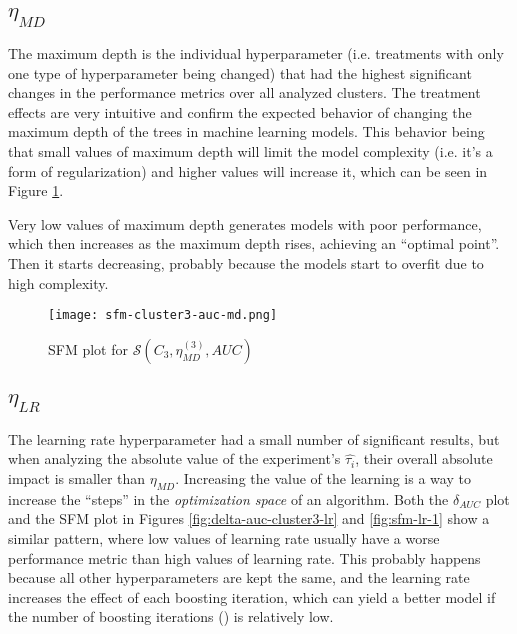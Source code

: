 \subsection{\texorpdfstring{\Large$\eta_{MD}$}{}}

The maximum depth is the individual hyperparameter (i.e. treatments with only one type of hyperparameter being changed) that had the highest significant changes in the performance metrics over all analyzed clusters. The treatment effects are very intuitive and confirm the expected behavior of changing the maximum depth of the trees in machine learning models. This behavior being that small values of maximum depth will limit the model complexity (i.e. it's a form of regularization) and higher values will increase it, which can be seen in Figure \ref{fig:sfm-md-1}.

Very low values of maximum depth generates models with poor performance, which then increases as the maximum depth rises, achieving an ``optimal point''. Then it starts decreasing, probably because the models start to overfit due to high complexity.

\begin{figure}[H]
    \centering
    \texttt{[image: sfm-cluster3-auc-md.png]}
    \caption{SFM plot for $\mathcal{S}(C_3, \eta^{(3)}_{MD}, AUC)$}
    \label{fig:sfm-md-1}
\end{figure}


\subsection{\texorpdfstring{\Large$\eta_{LR}$}{}}

The learning rate hyperparameter had a small number of significant results, but when analyzing the absolute value of the experiment's $\hat{\tau_i}$, their overall absolute impact is smaller than $\eta_{MD}$. Increasing the value of the learning is a way to increase the ``steps'' in the \textit{optimization space} of an algorithm. Both the $\delta_{AUC}$ plot and the SFM plot in Figures \ref{fig:delta-auc-cluster3-lr} and \ref{fig:sfm-lr-1} show a similar pattern, where low values of learning rate usually have a worse performance metric than high values of learning rate. This probably happens because all other hyperparameters are kept the same, and the learning rate increases the effect of each boosting iteration, which can yield a better model if the number of boosting iterations () is relatively low.

